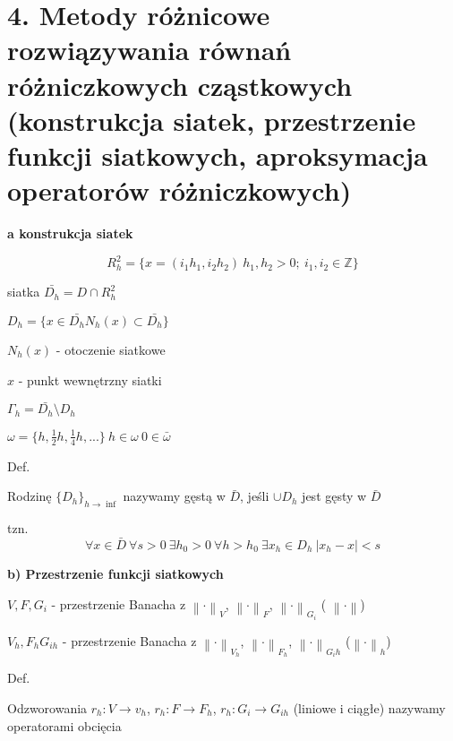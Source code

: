 \section{4. Metody różnicowe rozwiązywania równań różniczkowych cząstkowych (konstrukcja siatek, przestrzenie funkcji siatkowych, aproksymacja operatorów różniczkowych)}

\textbf{a\) konstrukcja siatek}

\[R^{2}_{h} = \{ x = (i_{1}h_{1}, i_{2}h_{2})\ h_{1},h_{2} > 0;\ i_{1},i_{2} \in \mathbb{Z}\}\]

siatka $\bar{D_{h}} = D \cap R^{2}_{h}$

$D_{h} = \{ x \in \bar{D_{h}} N_h(x) \subset \bar{D_{h}}\}$

$N_h(x)$ - otoczenie siatkowe

$x$ - punkt wewnętrzny siatki

$\Gamma_h = \bar{D_h} \setminus D_h$

$\omega = \{h, \frac{1}{2}h, \frac{1}{4}h, ...\}\ h \in \omega\ 0 \in \bar{\omega}$

Def.

Rodzinę $\{D_h\}_{h \rightarrow \inf}$ nazywamy gęstą w $\bar{D}$, jeśli $\cup D_h$ jest gęsty w $\bar{D}$

tzn.
\[\forall x \in \bar{D}\ \forall s > 0\ \exists h_0 > 0\ \forall h > h_0\ \exists x_h \in D_h\ |x_h - x| < s\]

\textbf{b) Przestrzenie funkcji siatkowych}

$V, F, G_i$ - przestrzenie Banacha z $\left \| \cdot \right \|_V$, $\left \| \cdot \right \|_F$, $\left \| \cdot \right \|_{G_i}$ ( $\left \| \cdot \right \|$)

$V_h, F_h G_{ih}$ - przestrzenie Banacha z $\left \| \cdot \right \|_{V_h}$, $\left \| \cdot \right \|_{F_h}$, $\left \| \cdot \right \|_{G_ih}$ ($\left \| \cdot \right \|_h$)

Def.

Odzworowania $r_h: V \rightarrow v_h$, $r_h: F \rightarrow F_h$, $r_h: G_i \rightarrow G_{ih}$ (liniowe i ciągłe) nazywamy operatorami obcięcia